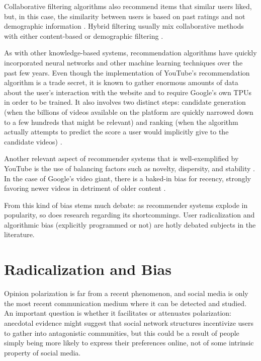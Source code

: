 Collaborative filtering algorithms also recommend items that similar users
liked, but, in this case, the similarity between users is based on past ratings
and not demographic information \citep{ricci_introduction_2011}. Hybrid
filtering usually mix collaborative methods with either content-based or
demographic filtering \citep{ricci_introduction_2011}.

As with other knowledge-based systems, recommendation algorithms have quickly
incorporated neural networks and other machine learning techniques over the past
few years. Even though the implementation of YouTube's recommendation algorithm
is a trade secret, it is known to gather enormous amounts of data about the
user's interaction with the website and to require Google's own TPUs in order to
be trained. It also involves two distinct steps: candidate generation (when the
billions of videos available on the platform are quickly narrowed down to a few
hundreds that might be relevant) and ranking (when the algorithm actually
attempts to predict the score a user would implicitly give to the candidate
videos) \citep{anonymous_improving_2022}.

Another relevant aspect of recommender systems that is well-exemplified by
YouTube is the use of balancing factors such as novelty, dispersity, and
stability \citep{zhao_recommending_2019}. In the case of Google's video giant,
there is a baked-in bias for recency, strongly favoring newer videos in
detriment of older content \citep{zhao_recommending_2019}.

From this kind of bias stems much debate: as recommender systems explode in
popularity, so does research regarding its shortcommings. User radicalization
and algorithmic bias (explicitly programmed or not) are hotly debated subjects
in the literature.

\section{Radicalization and Bias}
\label{sec:radicalization_bias}

Opinion polarization is far from a recent phenomenon, and social media is only
the most recent communication medium where it can be detected and studied. An
important question is whether it facilitates or attenuates polarization:
anecdotal evidence might suggest that social network structures incentivize
users to gather into antagonistic communities, but this could be a result of
people simply being more likely to express their preferences online, not of some
intrinsic property of social media.


